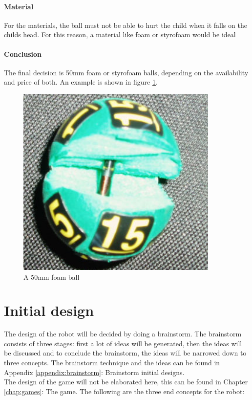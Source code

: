 \documentclass[11pt,twoside,a4paper]{report}
\begin{document}
\subsubsection{Material}
For the materials, the ball must not be able to hurt the child when it falls on the childs head. For this reason, a material like foam or styrofoam would be ideal 
\newpage
\subsubsection{Conclusion}
The final decision is 50mm foam or styrofoam balls, depending on the availability and price of both. An example is shown in figure \ref{figure:lotteryball}.
\begin{figure}[H]
\begin{center}
\includegraphics[width=10cm]{Images/LOTTERY-BALLS-with-rfid.jpg}
\end{center}
\caption{A 50mm foam ball}
\label{figure:lotteryball}
\end{figure}

\chapter{Initial design}
The design of the robot will be decided by doing a brainstorm. The brainstorm consists of three stages: first a lot of ideas will be generated, then the ideas will be discussed and to conclude the brainstorm, the ideas will be narrowed down to three concepts. The brainstorm technique and the ideas can be found in Appendix \ref{appendix:brainstorm}: Brainstorm initial designs. \\
The design of the game will not be elaborated here, this can be found in Chapter \ref{chap:games}: The game. The following are the three end concepts for the robot:
\end{document}
